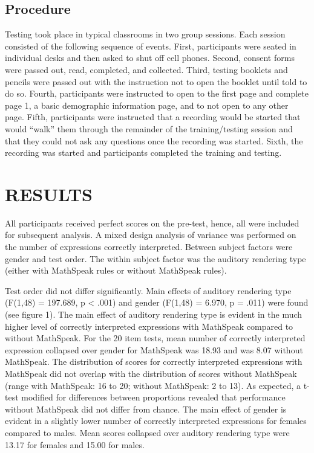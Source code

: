 \documentclass[11.5pt]{sig-alternate} %
\begin{document}
\begin{large}
\subsection*{Procedure}
Testing took place in typical classrooms in two group sessions. Each session consisted of the following sequence of events. First, participants were seated in individual desks and then asked to shut off cell phones. Second, consent forms were passed out, read, completed, and collected. Third, testing booklets and pencils were passed out with the instruction not to open the booklet until told to do so. Fourth, participants were instructed to open to the first page and complete page 1, a basic demographic information page, and to not open to any other page. Fifth, participants were instructed that a recording would be started that would “walk” them through the remainder of the training/testing session and that they could not ask any questions once the recording was started. Sixth, the recording was started and participants completed the training and testing.

\section*{RESULTS}
All participants received perfect scores on the pre-test, hence, all were included for subsequent analysis. A mixed design analysis of variance was performed on the number of expressions correctly interpreted. Between subject factors were gender and test order. The within subject factor was the auditory rendering type (either with MathSpeak rules or without MathSpeak rules).

Test order did not differ significantly. Main effects of auditory rendering type (F(1,48) = 197.689, p < .001) and gender (F(1,48) = 6.970, p = .011) were found (see figure 1). The main effect of auditory rendering type is evident in the much higher level of correctly interpreted expressions with MathSpeak compared to without MathSpeak. For the 20 item tests, mean number of correctly interpreted expression collapsed over gender for MathSpeak was 18.93 and was 8.07 without MathSpeak. The distribution of scores for correctly interpreted expressions with MathSpeak did not overlap with the distribution of scores without MathSpeak (range with MathSpeak: 16 to 20; without MathSpeak: 2 to 13). As expected, a t-test modified for differences between proportions revealed that performance without MathSpeak did not differ from chance. The main effect of gender is evident in a slightly lower number of correctly interpreted expressions for females compared to males. Mean scores collapsed over auditory rendering type were 13.17 for females and 15.00 for males.


\end{large}
\end{document}
